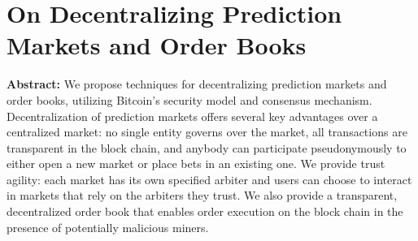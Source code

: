 \section{On Decentralizing Prediction Markets and Order Books}

\textbf{Abstract:} 
We propose techniques for decentralizing prediction markets and order books, utilizing
Bitcoin’s security model and consensus mechanism. Decentralization of prediction markets offers several
key advantages over a centralized market: no single entity governs over the market, all transactions are
transparent in the block chain, and anybody can participate pseudonymously to either open a new
market or place bets in an existing one. We provide trust agility: each market has its own specified
arbiter and users can choose to interact in markets that rely on the arbiters they trust. We also provide
a transparent, decentralized order book that enables order execution on the block chain in the presence
of potentially malicious miners.
